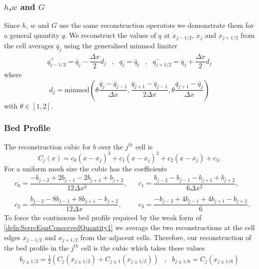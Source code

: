 \documentclass[times]{elsarticle}
\begin{document}
\subsubsection{$h$,$w$ and $G$ }
Since $h$, $w$ and $G$ use the same reconstruction operators we demonstrate them for a general quantity $q$. We reconstruct the values of $q$ at $x_{j-1/2} $, $x_{j} $ and $x_{j+1/2}$ from the cell averages $\overline{q}_j$ using the generalised minmod limiter \cite{VanLeer-1979-101}
\begin{subequations}
	\begin{align}
	q^+_{j-1/2} = \overline{q}_j - \dfrac{\Delta x}{2} d_j &,&
	q_{j}  =\overline{q}_j &,&
	q^-_{j+1/2}  = \overline{q}_j + \dfrac{\Delta x}{2} d_j
	\end{align}
	\label{eqn:ReconforhwG}
\end{subequations}
where 
\begin{equation}
d_j = \text{minmod}\left(\theta \dfrac{\overline{q}_j -\overline{q}_{j-1} }{\Delta x}, \dfrac{\overline{q}_{j+1} -\overline{q}_{j-1} }{2\Delta x}, \theta\dfrac{\overline{q}_{j+1} -\overline{q}_{j} }{\Delta x}\right)
\label{eqn:slopehGrecon}
\end{equation}
with $\theta \in \left[1,2\right]$.

\subsubsection{Bed Profile}
The reconstruction cubic for $b$ over the $j^{th}$ cell is
\begin{equation*}
C_j(x) = c_0 \left(x - x_j\right)^3 + c_1 \left(x - x_j\right)^2 + c_2 \left(x - x_j\right) + c_3.
\label{eqn:cubicforbedrecon}
\end{equation*}
For a uniform mesh size the cubic has the coefficients
\begin{align*}
&c_0 =  \dfrac{-b_{j-2} + 2b_{j-1} - 2 b_{j+1} + b_{j+2}}{12 \Delta x^3}, & &
c_1 =  \dfrac{b_{j-2} - b_{j-1} - b_{j+1} + b_{j+2}}{6 \Delta x^2},\\ \\
&c_2 =  \dfrac{b_{j-2} - 8b_{j-1} + 8 b_{j+1} - b_{j+2}}{12 \Delta x},& &
c_3 =  \dfrac{-b_{j-2}  + 4b_{j-1} + 4 b_{j+1} - b_{j+2}}{6}.
\end{align*}
To force the continuous bed profile required by the weak form of \eqref{defn:SerreEqnConservedQuantity1} we average the two reconstructions at the cell edges $x_{j-1/2}$ and $x_{j+1/2}$ from the adjacent cells. Therefore, our reconstruction of the bed profile in the $j^{th}$ cell is the cubic which takes these values
\begin{subequations}
	\begin{align}
	b_{j\pm1/2} =  \frac{1}{2}\left( C_j(x_{j\pm 1/2}) + C_{j\pm 1}(x_{j\pm 1/2})\right)&,& 	b_{j\pm 1/6} =  C_j(x_{j\pm 1/6})
	\end{align}
	\label{eqn:BedReconDef}
\end{subequations}
\end{document}
